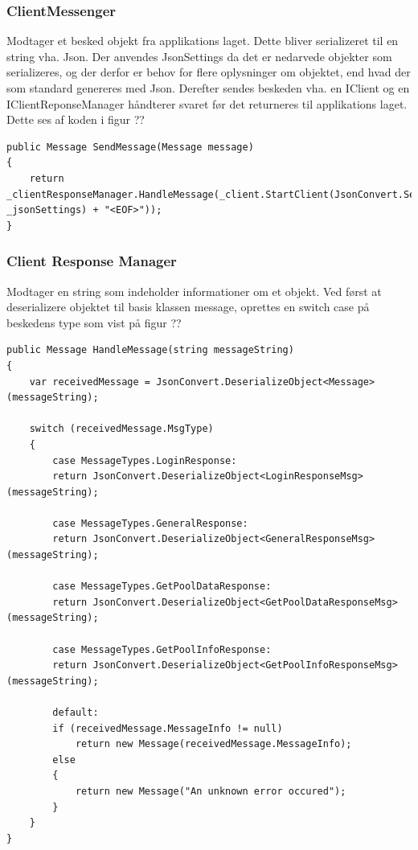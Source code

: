 \subsubsection{ClientMessenger}
Modtager et besked objekt fra applikations laget. Dette bliver serializeret til en string vha. Json. Der anvendes JsonSettings da det er nedarvede objekter som serializeres, og der derfor er behov for flere oplysninger om objektet, end hvad der som standard genereres med Json. Derefter sendes beskeden vha. en IClient og en IClientReponseManager håndterer svaret før det returneres til applikations laget. Dette ses af koden i figur ??
\begin{lstlisting}[caption=Client.SendMessage, label=code:Client.SendMessage]
public Message SendMessage(Message message)
{
	return _clientResponseManager.HandleMessage(_client.StartClient(JsonConvert.SerializeObject(message, _jsonSettings) + "<EOF>"));
}
\end{lstlisting}

\subsubsection{Client Response Manager}
Modtager en string som indeholder informationer om et objekt. Ved først at deserializere objektet til basis klassen message, oprettes en switch case på beskedens type som vist på figur ??
\begin{lstlisting}[caption=Client.HandleMessage, label=code:Client.HandleMessage]
public Message HandleMessage(string messageString)
{
	var receivedMessage = JsonConvert.DeserializeObject<Message>(messageString);
	
	switch (receivedMessage.MsgType)
	{
		case MessageTypes.LoginResponse:
		return JsonConvert.DeserializeObject<LoginResponseMsg>(messageString);
		
		case MessageTypes.GeneralResponse:
		return JsonConvert.DeserializeObject<GeneralResponseMsg>(messageString);
		
		case MessageTypes.GetPoolDataResponse:
		return JsonConvert.DeserializeObject<GetPoolDataResponseMsg>(messageString);
		
		case MessageTypes.GetPoolInfoResponse:
		return JsonConvert.DeserializeObject<GetPoolInfoResponseMsg>(messageString);
		
		default:
		if (receivedMessage.MessageInfo != null)
			return new Message(receivedMessage.MessageInfo);
		else
		{
			return new Message("An unknown error occured");
		}
	}
}
\end{lstlisting}

